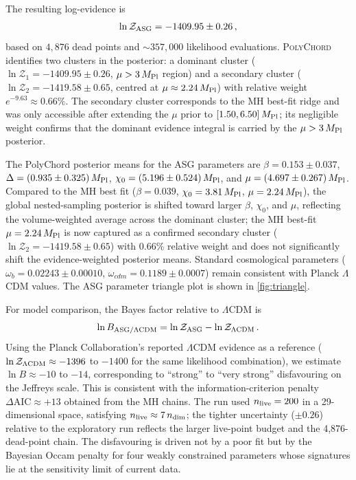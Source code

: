 \documentclass[11pt,a4paper]{article}
\begin{document}
The resulting log-evidence is
\begin{equation}
\ln\mathcal{Z}_{\rm ASG}=-1409.95\pm0.26\,,
\label{eq:lnZ}
\end{equation}
based on $4{,}876$ dead points and ${\sim}357{,}000$ likelihood evaluations. \textsc{PolyChord} identifies two clusters in the posterior: a dominant cluster ($\ln\mathcal{Z}_1=-1409.95\pm0.26$, $\mu>3\,M_{\rm Pl}$ region) and a secondary cluster ($\ln\mathcal{Z}_2=-1419.58\pm0.65$, centred at $\mu\approx2.24\,M_{\rm Pl}$) with relative weight $e^{-9.63}\approx0.66\%$. The secondary cluster corresponds to the MH best-fit ridge and was only accessible after extending the $\mu$ prior to $[1.50,6.50]\,M_{\rm Pl}$; its negligible weight confirms that the dominant evidence integral is carried by the $\mu>3\,M_{\rm Pl}$ posterior.

The PolyChord posterior means for the ASG parameters are $\beta=0.153\pm0.037$, $\Delta=(0.935\pm0.325)\,M_{\rm Pl}$, $\chi_0=(5.196\pm0.524)\,M_{\rm Pl}$, and $\mu=(4.697\pm0.267)\,M_{\rm Pl}$. Compared to the MH best fit ($\beta=0.039$, $\chi_0=3.81\,M_{\rm Pl}$, $\mu=2.24\,M_{\rm Pl}$), the global nested-sampling posterior is shifted toward larger $\beta$, $\chi_0$, and $\mu$, reflecting the volume-weighted average across the dominant cluster; the MH best-fit $\mu=2.24\,M_{\rm Pl}$ is now captured as a confirmed secondary cluster ($\ln\mathcal{Z}_2=-1419.58\pm0.65$) with 0.66\% relative weight and does not significantly shift the evidence-weighted posterior means. Standard cosmological parameters ($\omega_b=0.02243\pm0.00010$, $\omega_{cdm}=0.1189\pm0.0007$) remain consistent with Planck $\Lambda$CDM values. The ASG parameter triangle plot is shown in \cref{fig:triangle}.

For model comparison, the Bayes factor relative to $\Lambda$CDM is
\begin{equation}
\ln B_{\rm ASG/\Lambda CDM}=\ln\mathcal{Z}_{\rm ASG}-\ln\mathcal{Z}_{\Lambda\rm CDM}\,.
\end{equation}
Using the Planck Collaboration's reported $\Lambda$CDM evidence as a reference ($\ln\mathcal{Z}_{\Lambda\rm CDM}\approx-1396$ to $-1400$ for the same likelihood combination), we estimate $\ln B\approx-10$ to $-14$, corresponding to ``strong'' to ``very strong'' disfavouring on the Jeffreys scale. This is consistent with the information-criterion penalty $\Delta\text{AIC}\approx+13$ obtained from the MH chains. The run used $n_{\rm live}=200$ in a 29-dimensional space, satisfying $n_{\rm live}\approx7\,n_{\rm dim}$; the tighter uncertainty ($\pm0.26$) relative to the exploratory run reflects the larger live-point budget and the 4,876-dead-point chain. The disfavouring is driven not by a poor fit but by the Bayesian Occam penalty for four weakly constrained parameters whose signatures lie at the sensitivity limit of current data.
\end{document}
